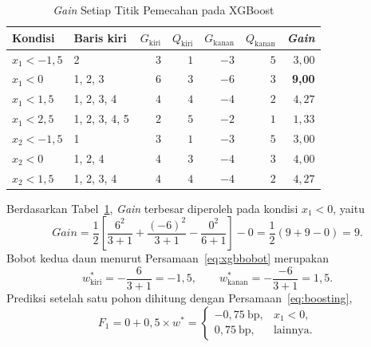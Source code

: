 \begin{table}[htbp]
  \caption{\textit{Gain} Setiap Titik Pemecahan pada XGBoost}
  \label{tab:man-gain}
  \centering
  \begingroup
  \footnotesize
  \setlength{\tabcolsep}{4pt}
  \begin{tabular}{|l|l|r|r|r|r|r|}
    \hline
    \textbf{Kondisi} & \textbf{Baris kiri} & \textbf{$G_{\text{kiri}}$} & \textbf{$Q_{\text{kiri}}$} & \textbf{$G_{\text{kanan}}$} & \textbf{$Q_{\text{kanan}}$} & \textbf{\textit{Gain}} \\
    \hline
    $x_1 < -1{,}5$ & 2 & $3$ & $1$ & $-3$ & $5$ & $3{,}00$ \\
    $x_1 < 0$ & 1, 2, 3 & $6$ & $3$ & $-6$ & $3$ & \textbf{9,00} \\
    $x_1 < 1{,}5$ & 1, 2, 3, 4 & $4$ & $4$ & $-4$ & $2$ & $4{,}27$ \\
    $x_1 < 2{,}5$ & 1, 2, 3, 4, 5 & $2$ & $5$ & $-2$ & $1$ & $1{,}33$ \\
    $x_2 < -1{,}5$ & 1 & $3$ & $1$ & $-3$ & $5$ & $3{,}00$ \\
    $x_2 < 0$ & 1, 2, 4 & $4$ & $3$ & $-4$ & $3$ & $4{,}00$ \\
    $x_2 < 1{,}5$ & 1, 2, 3, 4 & $4$ & $4$ & $-4$ & $2$ & $4{,}27$ \\
    \hline
  \end{tabular}
  \endgroup
\end{table}

Berdasarkan Tabel~\ref{tab:man-gain}, \textit{Gain} terbesar diperoleh pada
kondisi $x_1 < 0$, yaitu
\begin{equation*}
  \textit{Gain} = \frac{1}{2}\left[
    \frac{6^2}{3 + 1} + \frac{(-6)^2}{3 + 1} - \frac{0^2}{6 + 1}
  \right] - 0 = \frac{1}{2}(9 + 9 - 0) = 9 .
\end{equation*}
Bobot kedua daun menurut Persamaan~\eqref{eq:xgbbobot} merupakan
\begin{equation*}
  w^{*}_{\text{kiri}} = -\frac{6}{3 + 1} = -1{,}5, \qquad
  w^{*}_{\text{kanan}} = -\frac{-6}{3 + 1} = 1{,}5 .
\end{equation*}
Prediksi setelah satu pohon dihitung dengan Persamaan~\eqref{eq:boosting},
\begin{equation*}
  F_1 = 0 + 0{,}5 \times w^{*} =
  \begin{cases}
    -0{,}75~\text{bp}, & x_1 < 0,\\
    0{,}75~\text{bp}, & \text{lainnya}.
  \end{cases}
\end{equation*}

